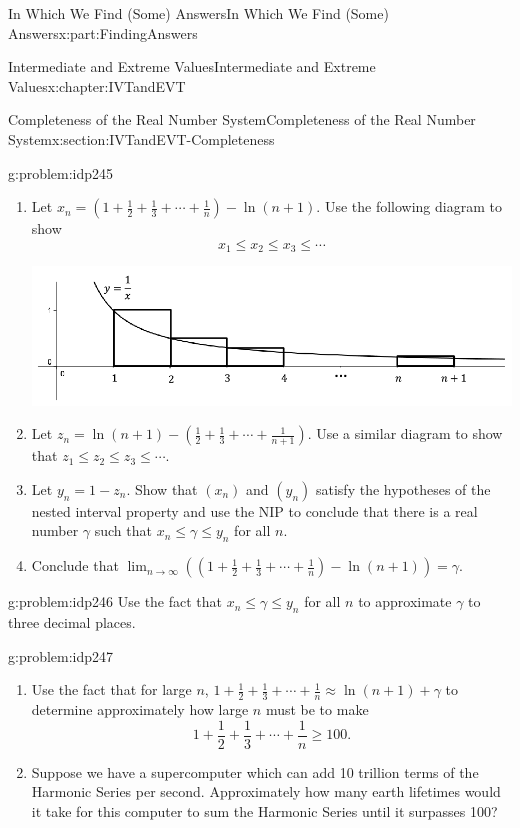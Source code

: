 \documentclass[oneside,10pt,]{book}
\numberwithin{equation}{section}
\begin{document}
\begin{partptx}{In Which We Find (Some) Answers}{}{In Which We Find (Some) Answers}{}{}{x:part:FindingAnswers}
\begin{chapterptx}{Intermediate and Extreme Values}{}{Intermediate and Extreme Values}{}{}{x:chapter:IVTandEVT}
\begin{sectionptx}{Completeness of the Real Number System}{}{Completeness of the Real Number System}{}{}{x:section:IVTandEVT-Completeness}
\begin{problem}{}{g:problem:idp245}
\begin{enumerate}[font=\bfseries,label=(\alph*),ref=\alph*]
\item{}Let \(x_n=\left(1+\frac{1}{2}+\frac{1}{3}+\cdots+\frac{1}{n}\right)-\ln\left(n+1 \right)\). Use the following diagram to show%
\begin{equation*}
x_1\leq x_2\leq x_3\leq\cdots
\end{equation*}
%
\begin{image}{0.08}{0.84}{0.08}%
\includegraphics[width=\linewidth]{images/Ch6fig7.png}
\end{image}%
\item{}Let \(z_n=\ln\left(n+1\right)-\left(\frac{1}{2}+\frac{1}{3}+\cdots+\frac{1}{n+1} \right)\). Use a similar diagram to show that \(z_1\leq z_2\leq z_3\leq\cdots\).%
\item{}Let \(y_n=1-z_n\).  Show that \(\left(x_n\right)\) and \(\left(y_n\right)\) satisfy the hypotheses of the nested interval property and use the NIP to conclude that there is a real number \(\gamma\) such that \(x_n\leq\gamma\leq
y_n\) for all \(n\).%
\item{}Conclude that \(\lim_{n\rightarrow\infty}\left(\left(1+\frac{1}{2}+\frac{1}{3}+\cdots+
\frac{1}{n}\right)-\ln\left(n+1\right)\right)=\gamma\).%
\end{enumerate}
\end{problem}
\begin{problem}{}{g:problem:idp246}%
Use the fact that \(x_n\leq\gamma\leq y_n\) for all \(n\) to approximate \(\gamma\) to three decimal places.%
\end{problem}
\begin{problem}{}{g:problem:idp247}%
\begin{enumerate}[font=\bfseries,label=(\alph*),ref=\alph*]
\item{}Use the fact that for large \(n\), \(1+\frac{1}{2}+\frac{1}{3}+\cdots+\frac{1}{n}\approx
\ln\left(n+1\right)+ \gamma\) to determine approximately how large \(n\) must be to make%
\begin{equation*}
1+\frac{1}{2}+\frac{1}{3}+\cdots+\frac{1}{n}\geq 100\text{.}
\end{equation*}
%
\item{}Suppose we have a supercomputer which can add 10 trillion terms of the Harmonic Series per second. Approximately how many earth lifetimes would it take for this computer to sum the Harmonic Series until it surpasses 100?%

\end{enumerate}
\end{problem}
\end{sectionptx}
\end{chapterptx}
\end{partptx}
\end{document}
